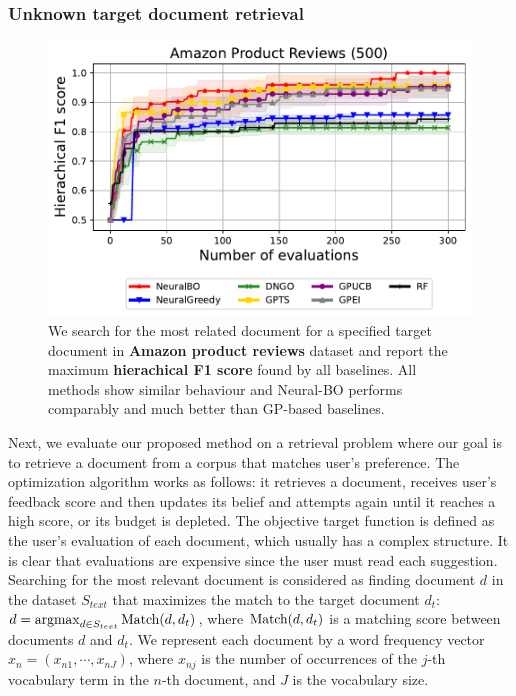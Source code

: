 \subsubsection{Unknown target document retrieval}
\begin{figure}[H]
    \centering
    \includegraphics[width=\textwidth]{Figures/Neural-BO/Neural-BO_AmazonReview_dim_500_round_300.pdf}
    \caption{We search for the most related document for a specified target document in \textbf{Amazon product reviews} dataset and report the maximum \textbf{hierachical F1 score} found by all baselines. All methods show similar behaviour and Neural-BO performs comparably and much better than GP-based baselines.}
    \label{fig:text}
\end{figure}
Next, we evaluate our proposed method on a retrieval problem where our goal is to retrieve a document from a corpus that matches user's preference. The optimization algorithm works as follows: it retrieves a document, receives user's feedback score and then updates its belief and attempts again until it reaches a high score, or its budget is depleted. The objective target function is defined as the user’s evaluation of each document, which usually has a complex structure. It is clear that evaluations are expensive since the user must read each suggestion. Searching for the most relevant document is considered as finding document $d$ in the dataset $S_{text}$ that maximizes the match to the target document $d_t$: $d = \operatorname*{argmax}_{d \in S_{text}} \textup{Match}(d, d_t)$, where $\textup{Match}(d, d_t)$ is a matching score between documents $d$ and $d_t$. We represent each document by a word frequency vector $x_{n} = (x_{n1}, \cdots, x_{nJ})$, where $x_{nj}$ is the number of occurrences of the $j$-th vocabulary term in the $n$-th document, and $J$ is the vocabulary size.  

